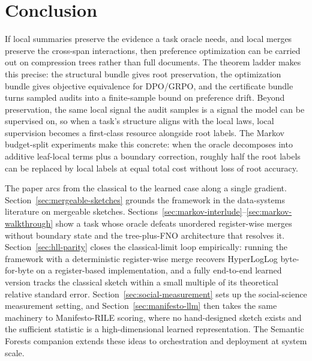 \section{Conclusion}\label{sec:conclusion}

If local summaries preserve the evidence a task oracle needs, and local merges preserve the cross-span interactions, then preference optimization can be carried out on compression trees rather than full documents. The theorem ladder makes this precise: the structural bundle gives root preservation, the optimization bundle gives objective equivalence for DPO/GRPO, and the certificate bundle turns sampled audits into a finite-sample bound on preference drift. Beyond preservation, the same local signal the audit samples is a signal the model can be supervised on, so when a task's structure aligns with the local laws, local supervision becomes a first-class resource alongside root labels. The Markov budget-split experiments make this concrete: when the oracle decomposes into additive leaf-local terms plus a boundary correction, roughly half the root labels can be replaced by local labels at equal total cost without loss of root accuracy.

The paper arcs from the classical to the learned case along a single gradient. Section~\ref{sec:mergeable-sketches} grounds the framework in the data-systems literature on mergeable sketches. Sections~\ref{sec:markov-interlude}--\ref{sec:markov-walkthrough} show a task whose oracle defeats unordered register-wise merges without boundary state and the tree-plus-FNO architecture that resolves it. Section~\ref{sec:hll-parity} closes the classical-limit loop empirically: running the framework with a deterministic register-wise merge recovers HyperLogLog byte-for-byte on a register-based implementation, and a fully end-to-end learned version tracks the classical sketch within a small multiple of its theoretical relative standard error. Section~\ref{sec:social-measurement} sets up the social-science measurement setting, and Section~\ref{sec:manifesto-llm} then takes the same machinery to Manifesto-RILE scoring, where no hand-designed sketch exists and the sufficient statistic is a high-dimensional learned representation. The Semantic Forests companion extends these ideas to orchestration and deployment at system scale.
